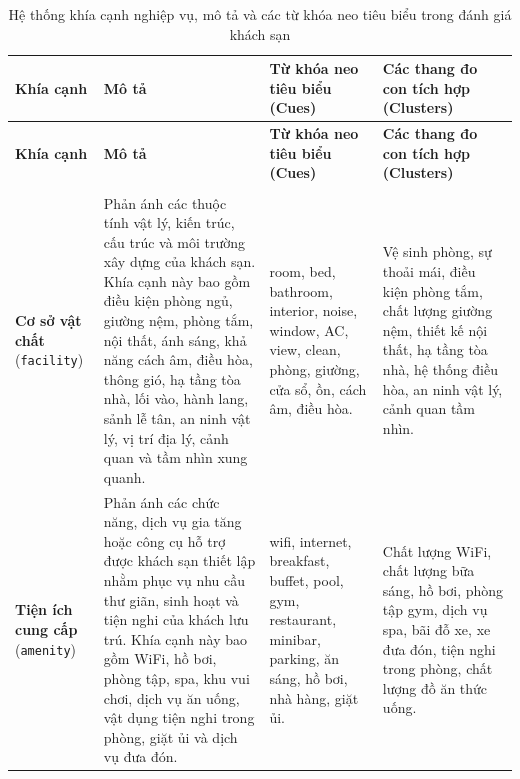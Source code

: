 
{\footnotesize
\setlength{\tabcolsep}{4pt}
\renewcommand{\arraystretch}{1.18}

\begin{longtable}{@{}
    >{\RaggedRight\arraybackslash}p{2.2cm}
    >{\RaggedRight\arraybackslash}p{5.4cm}
    >{\RaggedRight\arraybackslash}p{3.8cm}
    >{\RaggedRight\arraybackslash}p{4.6cm}
@{}}
\caption{Hệ thống khía cạnh nghiệp vụ, mô tả và các từ khóa neo tiêu biểu trong đánh giá khách sạn}
\label{tab:aspect-cues-description} \\

\toprule
\textbf{Khía cạnh} &
\textbf{Mô tả} &
\textbf{Từ khóa neo tiêu biểu (Cues)} &
\textbf{Các thang đo con tích hợp (Clusters)} \\
\midrule
\endfirsthead

\toprule
\textbf{Khía cạnh} &
\textbf{Mô tả} &
\textbf{Từ khóa neo tiêu biểu (Cues)} &
\textbf{Các thang đo con tích hợp (Clusters)} \\
\midrule
\endhead

\midrule
\multicolumn{4}{r}{\textit{Tiếp tục ở trang sau}} \\
\endfoot

\bottomrule
\endlastfoot

\textbf{Cơ sở vật chất}
(\texttt{facility})
&
Phản ánh các thuộc tính vật lý, kiến trúc, cấu trúc và môi trường xây dựng của khách sạn.
Khía cạnh này bao gồm điều kiện phòng ngủ, giường nệm, phòng tắm, nội thất, ánh sáng,
khả năng cách âm, điều hòa, thông gió, hạ tầng tòa nhà, lối vào, hành lang, sảnh lễ tân,
an ninh vật lý, vị trí địa lý, cảnh quan và tầm nhìn xung quanh.
&
room, bed, bathroom, interior, noise, window, AC, view, clean, phòng, giường, cửa sổ, ồn, cách âm, điều hòa.
&
Vệ sinh phòng, sự thoải mái, điều kiện phòng tắm, chất lượng giường nệm, thiết kế nội thất, hạ tầng tòa nhà, hệ thống điều hòa, an ninh vật lý, cảnh quan tầm nhìn. \\

\midrule

\textbf{Tiện ích cung cấp}
(\texttt{amenity})
&
Phản ánh các chức năng, dịch vụ gia tăng hoặc công cụ hỗ trợ được khách sạn thiết lập nhằm
phục vụ nhu cầu thư giãn, sinh hoạt và tiện nghi của khách lưu trú. Khía cạnh này bao gồm
WiFi, hồ bơi, phòng tập, spa, khu vui chơi, dịch vụ ăn uống, vật dụng tiện nghi trong phòng,
giặt ủi và dịch vụ đưa đón.
&
wifi, internet, breakfast, buffet, pool, gym, restaurant, minibar, parking, ăn sáng, hồ bơi, nhà hàng, giặt ủi.
&
Chất lượng WiFi, chất lượng bữa sáng, hồ bơi, phòng tập gym, dịch vụ spa, bãi đỗ xe, xe đưa đón, tiện nghi trong phòng, chất lượng đồ ăn thức uống. \\


\end{longtable}}
